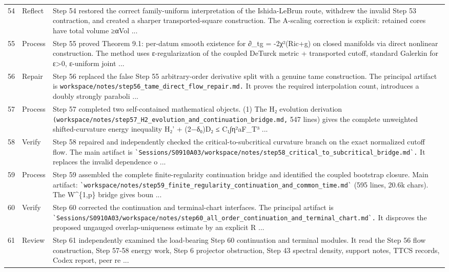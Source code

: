 \documentclass[UTF8,fontset=fandol,zihao=-4]{ctexart}
\begin{document}
\begin{longtable}{r p{} >{\raggedright\arraybackslash}p{}}
54 & Reflect & Step 54 restored the correct family-uniform interpretation of the Ishida-LeBrun route, withdrew the invalid Step 53 contraction, and created a sharper transported-square construction. The A-scaling correction is explicit: retained cores have total volume ≥αVol ...\\
55 & Process & Step 55 proved Theorem 9.1: per-datum smooth existence for ∂\_tg = -2χ²(Ric+g) on closed manifolds via direct nonlinear construction. The method uses ε-regularization of the coupled DeTurck metric + transported cutoff, standard Galerkin for ε>0, ε-uniform joint ...\\
56 & Repair & Step 56 replaced the false Step 55 arbitrary-order derivative split with a genuine tame construction. The principal artifact is \nolinkurl{workspace/notes/step56_tame_direct_flow_repair.md.} It proves the required interpolation count, introduces a doubly strongly paraboli ...\\
57 & Process & Step 57 completed two self-contained mathematical objects. (1) The H₂ evolution derivation \nolinkurl{(workspace/notes/step57_H2_evolution_and_continuation_bridge.md,} 547 lines) gives the complete unweighted shifted-curvature energy inequality H₂' + (2−δ₀)D₂ ≤ C₁∫η²aF\_T³ ...\\
58 & Verify & Step 58 repaired and independently checked the critical-to-subcritical curvature branch on the exact normalized cutoff flow. The main artifact is \nolinkurl{`Sessions/S0910A03/workspace/notes/step58_critical_to_subcritical_bridge.md`.} It replaces the invalid dependence o ...\\
59 & Process & Step 59 assembled the complete finite-regularity continuation bridge and identified the coupled bootstrap closure. Main artifact: \nolinkurl{`workspace/notes/step59_finite_regularity_continuation_and_common_time.md`} (595 lines, 20.6k chars). The W\textasciicircum{}\{1,p\} bridge gives boun ...\\
60 & Verify & Step 60 corrected the continuation and terminal-chart interfaces. The principal artifact is \nolinkurl{`Sessions/S0910A03/workspace/notes/step60_all_order_continuation_and_terminal_chart.md`.} It disproves the proposed ungauged overlap-uniqueness estimate by an explicit R ...\\
61 & Review & Step 61 independently examined the load-bearing Step 60 continuation and terminal modules. It read the Step 56 flow construction, Step 57-58 energy work, Step 6 projector obstruction, Step 43 spectral density, support notes, TTCS records, Codex report, peer re ...\\

\end{longtable}
\end{document}
